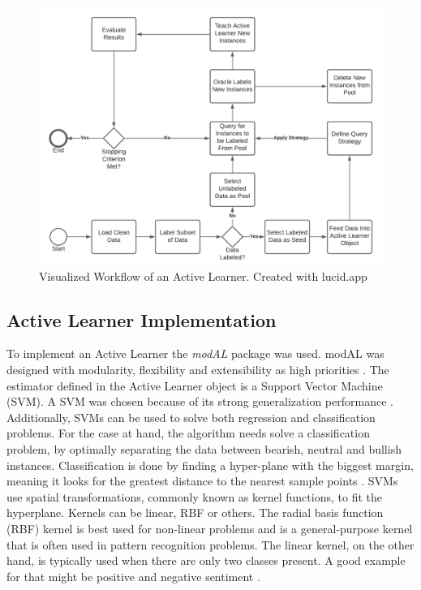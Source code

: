 \documentclass[11pt, a4paper]{article}
\begin{document}
\begin{figure}
    \centering
    \includegraphics[width=\textwidth]{al_workflow.png}
    \caption{Visualized Workflow of an Active Learner. Created with lucid.app}
    \label{fig:AL_Workflow}
\end{figure}

\subsection{Active Learner Implementation} \label{subs:activelearnerimplementation}
To implement an Active Learner the \emph{modAL} package was used. modAL was designed with modularity, flexibility and extensibility as high priorities \citep{danka2018modal}. 
The estimator defined in the Active Learner object is a Support Vector Machine (SVM). A SVM was chosen because of its strong generalization 
performance \citep{alves2014comparisonsvm}.
Additionally, SVMs can be used to solve both regression and 
classification problems. For the case at hand, the algorithm needs solve a classification problem, by optimally separating the data between bearish, 
neutral and bullish instances. Classification is done by finding a hyper-plane with the biggest margin, meaning it looks for the greatest distance 
to the nearest sample points \citep{jemai2021SentimentAnalysis}. SVMs use spatial transformations, commonly known as kernel functions, to fit the hyperplane. 
Kernels can be linear, RBF or others. The radial basis function (RBF) kernel is best used for non-linear problems and is a general-purpose kernel that 
is often used in pattern recognition problems. The linear kernel, on the other hand, is typically used when there are only two classes present. 
A good example for that might be positive and negative sentiment \citep{alves2014comparisonsvm}.
\end{document}
